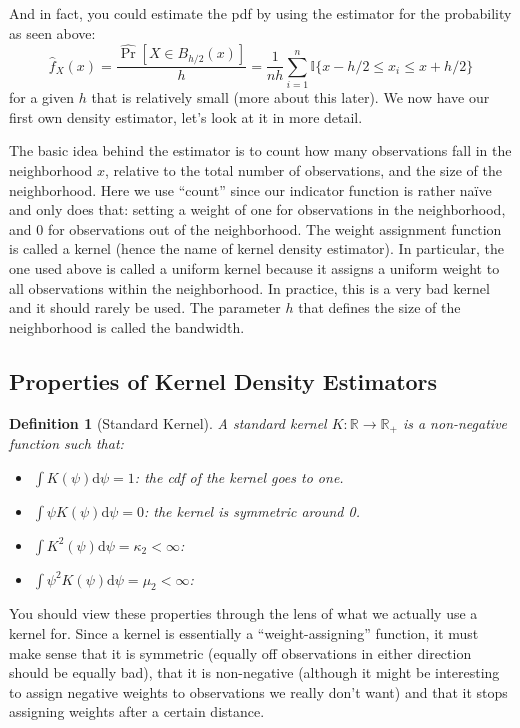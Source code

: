 \documentclass[12pt]{report}
\def\D{\mathrm{d}}
\newtheorem{definition}{Definition}[chapter]
\def\D{\mathrm{d}}
\newcommand{\Probhat}[1]{\hat{\operatorname{Pr}}\left[#1\right]}
\def\D{\mathrm{d}}
\begin{document}
And in fact, you could estimate the pdf by using the estimator for the probability as seen above: $$ \hat f_X(x) = \frac{\Probhat{X\in B_{h/2}(x)}}{h} = \frac{1}{nh} \sum_{i=1}^{n} \mathbb{I}\{ x - h/2 \leq x_i \leq x + h/2 \} $$ for a given $h$ that is relatively small (more about this later). We now have our first own density estimator, let's look at it in more detail.

The basic idea behind the estimator is to count how many observations fall in the neighborhood $x$, relative to the total number of observations, and the size of the neighborhood. Here we use ``count'' since our indicator function is rather naïve and only does that: setting a weight of one for observations in the neighborhood, and 0 for observations out of the neighborhood. The weight assignment function is called a kernel (hence the name of kernel density estimator). In particular, the one used above is called a uniform kernel because it assigns a uniform weight to all observations within the neighborhood. In practice, this is a very bad kernel and it should rarely be used. The parameter $h$ that defines the size of the neighborhood is called the bandwidth.

\subsection{Properties of Kernel Density Estimators}

\begin{definition}[Standard Kernel]
A standard kernel $K: \mathbb{R}\to\mathbb{R}_+$ is a non-negative function such that:\begin{itemize}
\item $\int K(\psi)\D \psi = 1$: the cdf of the kernel goes to one.
\item $\int \psi K(\psi)\D \psi = 0$: the kernel is symmetric around 0.
\item $\int K^2(\psi)\D \psi = \kappa_2 < \infty $:
\item $\int \psi^2 K(\psi)\D \psi = \mu_2 < \infty $: 
\end{itemize}
\end{definition}
You should view these properties through the lens of what we actually use a kernel for. Since a kernel is essentially a ``weight-assigning'' function, it must make sense that it is symmetric (equally off observations in either direction should be equally bad), that it is non-negative (although it might be interesting to assign negative weights to observations we really don't want) and that it stops assigning weights after a certain distance.
\end{document}
